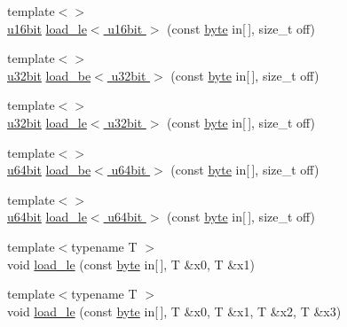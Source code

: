 \begin{DoxyCompactItemize}
\item 
{\footnotesize template$<$$>$ }\\\hyperlink{namespaceBotan_ab07face63a00c39ea6ed97f203ee501c}{u16bit} \hyperlink{namespaceBotan_a1bd3b897f02194923f9131f3b15131f6}{load\-\_\-le$<$ u16bit $>$} (const \hyperlink{namespaceBotan_a7d793989d801281df48c6b19616b8b84}{byte} in\mbox{[}$\,$\mbox{]}, size\-\_\-t off)
\item 
{\footnotesize template$<$$>$ }\\\hyperlink{namespaceBotan_aacc7d03c95e97e76168fc1c819031830}{u32bit} \hyperlink{namespaceBotan_ada14a2171e9368614e1f9eaf9d61262c}{load\-\_\-be$<$ u32bit $>$} (const \hyperlink{namespaceBotan_a7d793989d801281df48c6b19616b8b84}{byte} in\mbox{[}$\,$\mbox{]}, size\-\_\-t off)
\item 
{\footnotesize template$<$$>$ }\\\hyperlink{namespaceBotan_aacc7d03c95e97e76168fc1c819031830}{u32bit} \hyperlink{namespaceBotan_a121875bcc12c11af3cfdde8550f20c11}{load\-\_\-le$<$ u32bit $>$} (const \hyperlink{namespaceBotan_a7d793989d801281df48c6b19616b8b84}{byte} in\mbox{[}$\,$\mbox{]}, size\-\_\-t off)
\item 
{\footnotesize template$<$$>$ }\\\hyperlink{namespaceBotan_a634063d9fb05e25262ca94ed927030f6}{u64bit} \hyperlink{namespaceBotan_a2e835aeaf5e3ebd50c26e09e0a89001d}{load\-\_\-be$<$ u64bit $>$} (const \hyperlink{namespaceBotan_a7d793989d801281df48c6b19616b8b84}{byte} in\mbox{[}$\,$\mbox{]}, size\-\_\-t off)
\item 
{\footnotesize template$<$$>$ }\\\hyperlink{namespaceBotan_a634063d9fb05e25262ca94ed927030f6}{u64bit} \hyperlink{namespaceBotan_a438726c7ddef35532ab414f79cfecc13}{load\-\_\-le$<$ u64bit $>$} (const \hyperlink{namespaceBotan_a7d793989d801281df48c6b19616b8b84}{byte} in\mbox{[}$\,$\mbox{]}, size\-\_\-t off)
\item 
{\footnotesize template$<$typename T $>$ }\\void \hyperlink{namespaceBotan_a4921ac38f40aa928bc2aacfbe3340f33}{load\-\_\-le} (const \hyperlink{namespaceBotan_a7d793989d801281df48c6b19616b8b84}{byte} in\mbox{[}$\,$\mbox{]}, T \&x0, T \&x1)
\item 
{\footnotesize template$<$typename T $>$ }\\void \hyperlink{namespaceBotan_a572655a4ed76a454b41ec9df7377cbd3}{load\-\_\-le} (const \hyperlink{namespaceBotan_a7d793989d801281df48c6b19616b8b84}{byte} in\mbox{[}$\,$\mbox{]}, T \&x0, T \&x1, T \&x2, T \&x3)

\end{DoxyCompactItemize}
